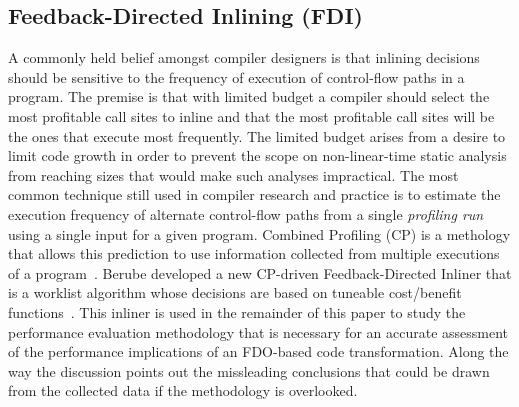 \subsection{Feedback-Directed Inlining (FDI)}

A commonly held belief amongst compiler designers is that inlining decisions should be sensitive to the frequency of execution of control-flow paths in a program. The premise is that with limited budget a compiler should select the most profitable call sites to inline and that the most profitable call sites will be the ones that execute most frequently. The limited budget arises from a desire to limit code growth in order to prevent the scope on non-linear-time static analysis from reaching sizes that would make such analyses impractical. The most common technique still used in compiler research and practice is to estimate the execution frequency of alternate control-flow paths from a single {\em profiling run} using a single input for a given program. Combined Profiling (CP) is a methology that allows this prediction to use information collected from multiple executions of a program~\cite{BerubeISPASS}. Berube developed a new CP-driven Feedback-Directed Inliner that is a worklist algorithm whose decisions are based on tuneable cost/benefit functions~\cite{BerubePhD}. This inliner is used in the remainder of this paper to study the performance evaluation methodology that is necessary for an accurate assessment of the performance implications of an FDO-based code transformation. Along the way the discussion points out the missleading conclusions that could be drawn from the collected data if the methodology is overlooked.
